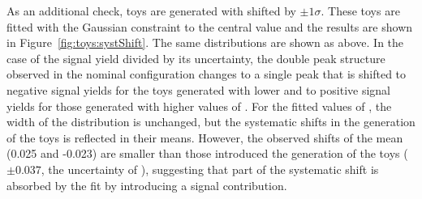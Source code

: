As an additional check, toys are generated with \Rsfof shifted by $\pm1\sigma$. These toys are fitted with the Gaussian constraint to the central value and the results are shown in Figure~\ref{fig:toys:systShift}. The same distributions are shown as above. In the case of the signal yield divided by its uncertainty, the double peak structure observed in the nominal configuration changes to a single peak that is shifted to negative signal yields for the toys generated with lower and to positive signal yields for those generated with higher values of \Rsfof. For the fitted values of \Rsfof, the width of the distribution is unchanged, but the systematic shifts in the generation of the toys is reflected in their means. However, the observed shifts of the mean (0.025 and -0.023) are smaller than those introduced the generation of the toys ($\pm0.037$, the uncertainty of \Rsfof), suggesting that part of the systematic shift is absorbed by the fit by introducing a signal contribution.
